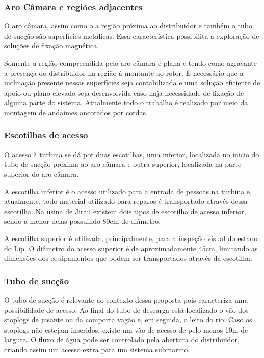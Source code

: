 
\subsubsection{Aro Câmara e regiões adjacentes}

O aro câmara, assim como o a região próxima ao distribuidor e também o tubo de sucção são superfícies metálicas. Essa característica possibilita a exploração de soluções de fixação magnética. 

Somente a região compreendida pelo aro câmara é plana e tendo como agravante a presença do distribuidor na região à montante ao rotor. É necessário que a inclinação presente nessas superfícies seja contabilizada e uma solução eficiente de apoio ou plano elevado seja desenvolvida caso haja necessidade de fixação de alguma parte do sistema. Atualmente todo o trabalho é realizado por meio da montagem de andaimes ancorados por cordas.
 
\subsubsection{Escotilhas de acesso}
O acesso à turbina se dá por duas escotilhas, uma inferior, localizada no ínicio do tubo de sucção próxima ao aro câmara e outra superior, localizada na parte superior do aro câmara.

A escotilha inferior é o acesso utilizado para a entrada de pessoas na turbina e, atualmente, todo material utilizado para reparos é transportado através dessa escotilha. Na usina de Jirau existem dois tipos de escotilha de acesso inferior, sendo a menor delas possuindo 80cm de diâmetro. 

A escotilha superior é utilizada, principalmente, para a inspeção visual do estado do Lip. %
O diâmetro do acesso superior é de aproximadamente 45cm, limitando as dimensões dos equipamentos que podem ser transportados através da escotilha. 

\subsubsection{Tubo de sucção}

O tubo de sucção é relevante ao contexto dessa proposta pois caracteriza uma possibilidade de acesso. Ao final do tubo de descarga está localizado o vão dos stoplogs de jusante ou da comporta vagão e, em seguida, o leito do rio. Caso os stoplogs não estejam inseridos, existe um vão de acesso de pelo menos 10m de largura. O fluxo de água pode ser controlado pela abertura do distribuidor, criando assim um acesso extra para um sistema submarino.

